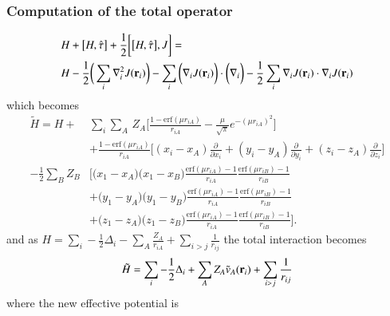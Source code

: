 \documentclass[aip,jcp,reprint,noshowkeys,superscriptaddress]{revtex4-1}
\newcommand{\deriv}[3]{\frac{\partial^{#3} #1}{\partial {#2}^{#3}}}
\newcommand{\br}[0]{{\bf {r}}}
\begin{document}
\subsubsection{Computation of the total operator}
\begin{equation}
 \begin{aligned}
& H + \big[ H,\hat{\tau} \big] + \frac{1}{2} \bigg[ \big[H,\hat{\tau}\big],J\bigg] = \\ & H -\frac{1}{2} \bigg( \sum_i \nabla^2_i J(\br{}_i) \bigg)    
                                                                   -\sum_i \bigg(\nabla_i J(\br{}_i) \bigg) \cdot \bigg( \nabla_i  \bigg)  
                                                                   -\frac{1}{2}\sum_i \nabla_i J({\bf r}_i) \cdot \nabla_i J({\bf r}_i) 
 \end{aligned}
\end{equation}
which becomes
\begin{equation}
 \begin{aligned}
  \tilde{H} = H +&  \sum_i \sum_{A}\, Z_A  \bigg[ \frac{1 - \text{erf}(\mu r_{iA})}{r_{iA}}  - \frac{\mu}{\sqrt{\pi}} e^{-(\mu r_{iA})^2}  \bigg] \\
           &+  \frac{1 - \text{erf}(\mu r_{iA})}{r_{iA}} \bigg[ (x_i - x_A) \deriv{}{x_i}{} + (y_i - y_A) \deriv{}{y_i}{} + (z_i - z_A) \deriv{}{z_i}{}\bigg] \\
           - \frac{1}{2}\sum_{B} Z_B &\bigg[ \big( x_1 - x_A \big) \big( x_1 - x_B \big)  \frac{\text{erf}(\mu r_{iA}) - 1}{r_{iA}} \frac{\text{erf}(\mu r_{iB}) - 1}{r_{iB}} \\
           &+  \big( y_1 - y_A \big) \big( y_1 - y_B \big)  \frac{\text{erf}(\mu r_{iA}) - 1}{r_{iA}} \frac{\text{erf}(\mu r_{iB}) - 1}{r_{iB}} \\ 
           &+  \big( z_1 - z_A \big) \big( z_1 - z_B \big)  \frac{\text{erf}(\mu r_{iA}) - 1}{r_{iA}} \frac{\text{erf}(\mu r_{iB}) - 1}{r_{iB} } \bigg].
 \end{aligned}
\end{equation}
and as $H = \sum_i -\frac{1}{2} \Delta_i - \sum_A \frac{Z_A}{r_{iA}} + \sum_{i>j} \frac{1}{r_{ij}} $ the total interaction becomes 
\begin{equation}
 \label{eq:final_one_e_h}
 \tilde{H} =  \sum_i -\frac{1}{2} \Delta_i + \sum_A Z_A \tilde{v}_A({\bf r}_i)  + \sum_{i>j} \frac{1}{r_{ij}}
\end{equation}
where the new effective potential is 
\end{document}
